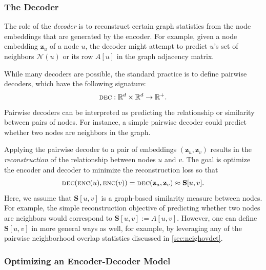 \documentclass[10pt]{book}
\let\defaultmarginpar\marginpar
\renewcommand\marginpar[2][]{\defaultmarginpar{\itshape\color{gray}#2}}
\begin{document}
\subsubsection{The Decoder}

The role of the \emph{decoder}\marginpar{decoder} is to reconstruct certain graph statistics from the node embeddings that are generated by the encoder. For example, given a node embedding $\mathbf z_u$ of a node $u$, the decoder might attempt to predict $u$'s set of neighbors $\mathcal N(u)$ or its row $A[u]$ in the graph adjacency matrix.

While many decoders are possible, the standard practice is to define pairwise decoders, which have the following signature:
\begin{equation}
    \textsc{dec}: \mathbb R^d \times \mathbb R^d \rightarrow \mathbb R^+.
\end{equation}
Pairwise decoders can be interpreted as predicting the relationship or similarity between pairs of nodes. For instance, a simple pairwise decoder could predict whether two nodes are neighbors in the graph.

Applying the pairwise decoder to a pair of embeddings $(\mathbf z_u, \mathbf z_v)$ results in the \emph{reconstruction} of the relationship between nodes $u$ and $v$. The goal is optimize the encoder and decoder to minimize the reconstruction loss so that
\begin{equation}
    \textsc{dec}(\textsc{enc}(u), \textsc{enc}(v)) = \textsc{dec}(\mathbf z_u, \mathbf z_v) \approx \mathbf S[u, v].
    \label{eq:reconstrloss}
\end{equation}
Here, we assume that $\mathbf S[u, v]$ is a graph-based similarity measure between nodes. For example, the simple reconstruction objective of predicting whether two nodes are neighbors would correspond to $\mathbf S[u, v] := A[u, v]$. However, one can define $\mathbf S[u, v]$ in more general ways as well, for example, by leveraging any of the pairwise neighborhood overlap statistics discussed in \autoref{sec:neighovdet}.


\subsubsection{Optimizing an Encoder-Decoder Model}
\end{document}
